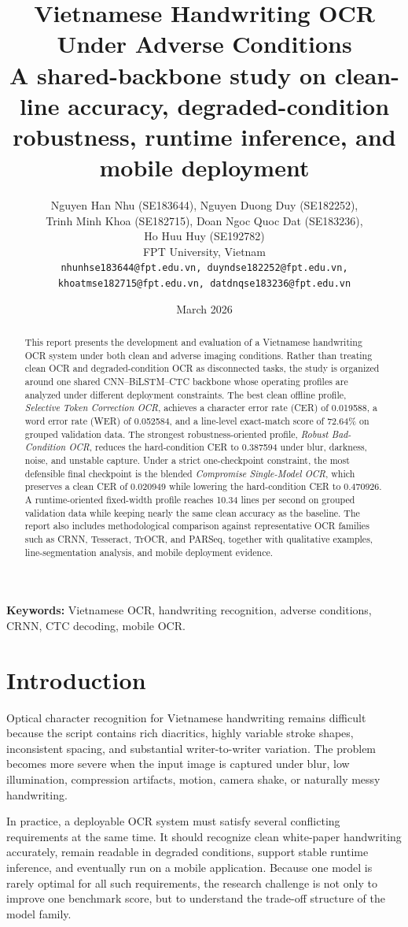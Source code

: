 \documentclass[12pt,a4paper]{article}
\title{\textbf{Vietnamese Handwriting OCR Under Adverse Conditions}\\
\large A shared-backbone study on clean-line accuracy, degraded-condition robustness, runtime inference, and mobile deployment}
\author{%
Nguyen Han Nhu (SE183644), Nguyen Duong Duy (SE182252),\\
Trinh Minh Khoa (SE182715), Doan Ngoc Quoc Dat (SE183236),\\
Ho Huu Huy (SE192782)\\[0.4em]
FPT University, Vietnam\\
\texttt{nhunhse183644@fpt.edu.vn, duyndse182252@fpt.edu.vn,}\\
\texttt{khoatmse182715@fpt.edu.vn, datdnqse183236@fpt.edu.vn}
}
\date{March 2026}
\begin{document}
\maketitle

\begin{abstract}
This report presents the development and evaluation of a Vietnamese handwriting OCR system under both clean and adverse imaging conditions. Rather than treating clean OCR and degraded-condition OCR as disconnected tasks, the study is organized around one shared CNN--BiLSTM--CTC backbone whose operating profiles are analyzed under different deployment constraints. The best clean offline profile, \emph{Selective Token Correction OCR}, achieves a character error rate (CER) of 0.019588, a word error rate (WER) of 0.052584, and a line-level exact-match score of 72.64\% on grouped validation data. The strongest robustness-oriented profile, \emph{Robust Bad-Condition OCR}, reduces the hard-condition CER to 0.387594 under blur, darkness, noise, and unstable capture. Under a strict one-checkpoint constraint, the most defensible final checkpoint is the blended \emph{Compromise Single-Model OCR}, which preserves a clean CER of 0.020949 while lowering the hard-condition CER to 0.470926. A runtime-oriented fixed-width profile reaches 10.34 lines per second on grouped validation data while keeping nearly the same clean accuracy as the baseline. The report also includes methodological comparison against representative OCR families such as CRNN, Tesseract, TrOCR, and PARSeq, together with qualitative examples, line-segmentation analysis, and mobile deployment evidence.
\end{abstract}

\noindent\textbf{Keywords:} Vietnamese OCR, handwriting recognition, adverse conditions, CRNN, CTC decoding, mobile OCR.

\section{Introduction}
Optical character recognition for Vietnamese handwriting remains difficult because the script contains rich diacritics, highly variable stroke shapes, inconsistent spacing, and substantial writer-to-writer variation. The problem becomes more severe when the input image is captured under blur, low illumination, compression artifacts, motion, camera shake, or naturally messy handwriting.

In practice, a deployable OCR system must satisfy several conflicting requirements at the same time. It should recognize clean white-paper handwriting accurately, remain readable in degraded conditions, support stable runtime inference, and eventually run on a mobile application. Because one model is rarely optimal for all such requirements, the research challenge is not only to improve one benchmark score, but to understand the trade-off structure of the model family.
\end{document}
